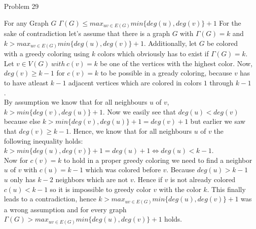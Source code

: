 \documentclass[a4paper]{article}
\begin{document}
\begin{solution}{Problem 29}
		
		\begin{theorem}{For any Graph $G$  $\Gamma(G) \leq max_{uv \in E(G)} min\{deg(u), deg(v)\} + 1$}
		For the sake of contradiction let's assume that there is a graph $G$ with $\Gamma(G) = k$ and $k > max_{uv \in E(G)} min\{deg(u), deg(v)\} + 1$. 
		Additionally, let $G$ be colored with a greedy coloring using $k$ colors which obviously has to exist if $\Gamma(G) = k$. \\
		Let $v \in V(G)\ with\ c(v) = k$ be one of the vertices with the highest color. 
		Now, $deg(v) \geq k-1$  for $c(v)=k$ to be possible in a gready coloring, because $v$ has to have atleast $k-1$ adjacent vertices which are colored in colors $1$ through $k-1$. \\
		By assumption we know that for all neighbours $u$ of $v$, $k> min\{deg(v), deg(u)\} + 1$. 
		Now we easily see that $deg(u) < deg(v)$ because else  $k > min\{deg(v), deg(u)\} + 1 = deg(v) + 1$ but earlier we saw that $deg(v) \geq k-1$. 
		Hence, we know that for all neighbours $u$ of $v$ the following inequality holds: $k > min\{deg(u), deg(v)\} + 1 = deg(u) + 1 \Leftrightarrow deg(u) < k - 1$. \\
		Now for $c(v)=k$ to hold in a proper greedy coloring we need to find a neighbor $u$ of $v$ with $c(u)=k-1$ which was colored before $v$. 
		Because $deg(u) > k-1$ $u$ only has $k-2$ neighbors which are not $v$. 
		Hence if $v$ is not already colored $c(u) < k-1$ so it is impossible to greedy color $v$ with the color $k$. 
		This finally leads to a contradiction, hence $k > max_{uv \in E(G)} min\{deg(u), deg(v)\} + 1$ was a wrong assumption and for every graph $\Gamma(G) > max_{uv \in E(G)} min\{deg(u), deg(v)\} + 1$ holds.
		\end{theorem}
	\end{solution}
	
\end{document}
